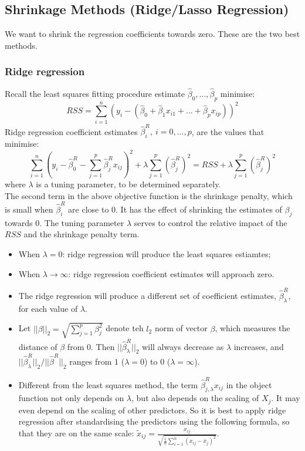 \documentclass[11pt]{article}
\begin{document}
\subsection{Shrinkage Methods (Ridge/Lasso Regression)}
\noindent We want to shrink the regression coefficients towards zero. These are the two best methods.
\subsubsection{Ridge regression}
\noindent Recall the least squares fitting procedure estimate $\hat\beta_0,...,\hat\beta_p$ minimise:
$$RSS = \sum_{i=1}^{n}{(y_i - (\hat\beta_0 + \hat\beta_1x_{i1} + ... + \hat\beta_px_{ip}))^2}$$
\noindent Ridge regression coefficient estimates $\hat\beta_{i}^{R}, \ i = 0,...,p$, are the values that minimise:
$$\sum_{i=1}^{n}(y_i - \hat\beta_0^R - \sum_{j=1}^{p}{\hat{\beta}_{j}^{R}x_{ij}})^2 + \lambda\sum_{j=1}^{p}{(\hat{\beta}_{j}^{R})^2} = RSS + \lambda\sum_{j=1}^{p}{(\hat{\beta}_{j}^{R})^2}$$
\noindent where $\lambda$ is a tuning parameter, to be determined separately.\\

\noindent The second term in the above objective function is the shrinkage penalty, which is small when $\hat\beta_i^{R}$ are close to $0$. It has the effect of shrinking the estimates of $\beta_j$ towards $0$. The tuning parameter $\lambda$ serves to control the relative impact of the $RSS$ and the shrinkage penalty term.
\begin{itemize}
    \item When $\lambda = 0$: ridge regression will produce the least squares estiamtes;
    \item When $\lambda \rightarrow \infty$: ridge regression coefficient estimates will approach zero.
    \item The ridge regression will produce a different set of coefficient estimates, $\hat{\beta}_{\lambda}^{R}$, for each value of $\lambda$.
    \item Let $|| \beta||_2 = \sqrt{\sum_{j=1}^{p}{\beta_j^2}}$ denote teh $l_2$ norm of vector $\beta$, which measures the distance of $\beta$ from $0$. Then $||\hat\beta_{\lambda}^R||_2$ will always decrease as $\lambda$ increases,  and $||\hat\beta_{\lambda}^R||_2/||\hat\beta^R||_2$ ranges from $1$ ($\lambda = 0$) to $0$ ($\lambda = \infty$).
    \item Different from the least squares method, the term $\hat{\beta}_{j,\lambda}^{R} x_{ij}$ in the object function not only depends on $\lambda$, but also depends on the scaling of $X_j$. It may even depend on the scaling of other predictors. So it is best to apply ridge regression after standardising the predictors using the following formula, so that they are on the same scale: $\tilde{x}_{ij} = \frac{x_{ij}}{\sqrt{\frac{1}{n}\sum_{i=1}^{n}{(x_{ij} - \bar{x}_{j})^2}}}$.
\end{itemize} \phantom{i}
\end{document}
